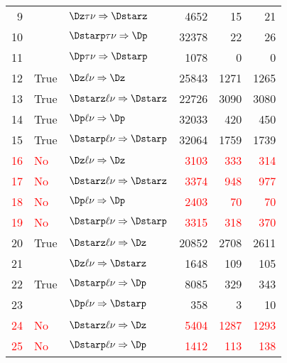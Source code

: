 \documentclass[6pt]{article}
\newcommand{\Red} [1]  {\textcolor{red}{#1}}
\begin{document}
\begin{tabular}{r l l r r r}
9   &       & $\Dz\tau\nu\Rightarrow\Dstarz$                         &  4652	     & 15       & 21        \\
10  &       & $\Dstarp\tau\nu\Rightarrow\Dp$                         &  32378	     & 22       & 26        \\
11  &       & $\Dp\tau\nu\Rightarrow\Dstarp$                         &  1078	     & 0        & 0         \\
12  &  True  & $\Dz\ell\nu\Rightarrow\Dz$                             &  25843	     & 1271     & 1265      \\
13  &  True  & $\Dstarz\ell\nu\Rightarrow\Dstarz$                     &  22726	     & 3090     & 3080      \\
14  &  True  & $\Dp\ell\nu\Rightarrow\Dp$                             &  32033	     & 420      & 450       \\
15  &  True  & $\Dstarp\ell\nu\Rightarrow\Dstarp$                     &  32064	     & 1759     & 1739      \\
\Red{16}  &  \Red{No}   & \Red{$\Dz\ell\nu\Rightarrow\Dz$}                             &  \Red{3103}	     & \Red{333}      & \Red{314}       \\
\Red{17}  &  \Red{No}   & \Red{$\Dstarz\ell\nu\Rightarrow\Dstarz$}                     &  \Red{3374}	     & \Red{948}      & \Red{977}       \\
\Red{18}  &  \Red{No}   & \Red{$\Dp\ell\nu\Rightarrow\Dp$}                             &  \Red{2403}	     & \Red{70}       & \Red{70}        \\
\Red{19}  &  \Red{No}   & \Red{$\Dstarp\ell\nu\Rightarrow\Dstarp$}                     &  \Red{3315}	     & \Red{318}      & \Red{370}       \\
20  &  True  & $\Dstarz\ell\nu\Rightarrow\Dz$                         &  20852	     & 2708     & 2611      \\
21  &       & $\Dz\ell\nu\Rightarrow\Dstarz$                         &  1648	     & 109      & 105       \\
22  &  True  & $\Dstarp\ell\nu\Rightarrow\Dp$                         &  8085	     & 329      & 343       \\
23  &       & $\Dp\ell\nu\Rightarrow\Dstarp$                         &  358	     & 3        & 10        \\
\Red{24}  &  \Red{No}   & \Red{$\Dstarz\ell\nu\Rightarrow\Dz$}                         &  \Red{5404}	     & \Red{1287}     & \Red{1293}      \\
\Red{25}  &  \Red{No}   & \Red{$\Dstarp\ell\nu\Rightarrow\Dp$}                         &  \Red{1412}	     & \Red{113}      & \Red{138}       \\ \hline

\end{tabular}
\end{document}
